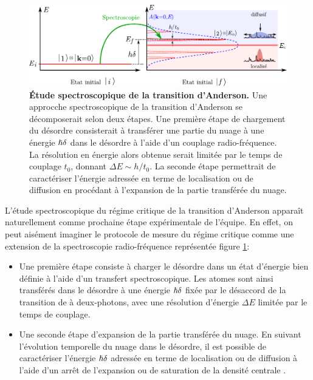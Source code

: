 \begin{figure}
\centering
\includegraphics[width=\textwidth]{Fig/Conclusion/spectro_transition_anderson.pdf}
\caption{\textbf{Étude spectroscopique de la transition d'Anderson.} Une approcche spectroscopique de la transition d'Anderson se décomposerait selon deux étapes. Une première étape de chargement du désordre consisterait à transférer une partie du nuage à une énergie $\hslash\delta$ dans le désordre à l'aide d'un couplage radio-fréquence. La résolution en énergie alors obtenue serait limitée par le temps de couplage $t_0$, donnant $\Delta E \sim h/t_0$. La seconde étape permettrait de caractériser l'énergie adressée en terme de localisation ou de diffusion en procédant à l'expansion de la partie transférée du nuage.}
\label{fig:spectro_transition_anderson}
\end{figure}

L'étude spectroscopique du régime critique de la transition d'Anderson apparaît naturellement comme prochaine étape expérimentale de l'équipe. En effet, on peut aisément imaginer le protocole de mesure du régime critique comme une extension de la spectroscopie radio-fréquence représentée figure \ref{fig:spectro_transition_anderson}:
\begin{itemize}
\item[\textendash] Une première étape consiste à charger le désordre dans un état d'énergie bien définie à l'aide d'un transfert spectroscopique. Les atomes sont ainsi transférés dans le désordre à une énergie $\hslash\delta$ fixée par le désaccord de la transition de à deux-photons, avec une résolution d'énergie $\Delta E$ limitée par le temps de couplage.
\item[\textendash] Une seconde étape d'expansion de la partie transférée du nuage. En suivant l'évolution temporelle du nuage dans le désordre, il est possible de caractériser l'énergie $\hslash\delta$ adressée en terme de localisation ou de diffusion à l'aide d'un arrêt de l'expansion ou de saturation de la densité centrale \citep{billy2008direct}\citep{jendrzejewski2012three}.
\end{itemize}

